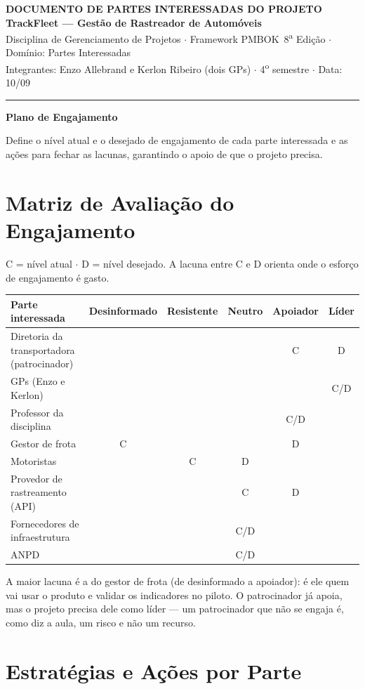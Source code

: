 \documentclass[11pt,a4paper]{article}
\newcommand{\cabecalho}[3]{%
  \begin{center}
  {\Large\bfseries DOCUMENTO DE #1 DO PROJETO}\\[2pt]
  {\large\bfseries TrackFleet --- Gestão de Rastreador de Automóveis}\\[4pt]
  Disciplina de Gerenciamento de Projetos $\cdot$ Framework PMBOK\textregistered\ 8\textsuperscript{a} Edição $\cdot$ Domínio: #2\\[2pt]
  Integrantes: Enzo Allebrand e Kerlon Ribeiro (dois GPs) $\cdot$ 4\textsuperscript{o} semestre $\cdot$ Data: #3
  \end{center}
  \vspace{2mm}\hrule\vspace{4mm}}
\newcommand{\parte}[1]{\noindent\textbf{\large #1}\par\vspace{1mm}}
\begin{document}
\cabecalho{PARTES INTERESSADAS}{Partes Interessadas}{10/09}

\parte{Plano de Engajamento}
\noindent Define o nível atual e o desejado de engajamento de cada parte interessada e as ações para fechar as lacunas, garantindo o apoio de que o projeto precisa.

\section{Matriz de Avaliação do Engajamento}
C = nível atual $\cdot$ D = nível desejado. A lacuna entre C e D orienta onde o esforço de engajamento é gasto.

\begin{center}
\small
\begin{tabularx}{\textwidth}{L c c c c c}
\toprule
\textbf{Parte interessada} & \textbf{Desinformado} & \textbf{Resistente} & \textbf{Neutro} & \textbf{Apoiador} & \textbf{Líder} \\
\midrule
Diretoria da transportadora (patrocinador) & & & & C & D \\
GPs (Enzo e Kerlon) & & & & & C/D \\
Professor da disciplina & & & & C/D & \\
Gestor de frota & C & & & D & \\
Motoristas & & C & D & & \\
Provedor de rastreamento (API) & & & C & D & \\
Fornecedores de infraestrutura & & & C/D & & \\
ANPD & & & C/D & & \\
\bottomrule
\end{tabularx}
\end{center}

\noindent A maior lacuna é a do gestor de frota (de desinformado a apoiador): é ele quem vai usar o produto e validar os indicadores no piloto. O patrocinador já apoia, mas o projeto precisa dele como líder --- um patrocinador que não se engaja é, como diz a aula, um risco e não um recurso.

\section{Estratégias e Ações por Parte}
\end{document}
